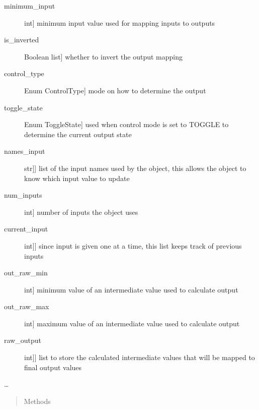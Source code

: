 \documentclass[letterpaper,10pt,english]{sphinxmanual}
\begin{document}
\begin{fulllineitems}
\begin{description}
\item[{minimum\_input}] \leavevmode{[}int{]}
\sphinxAtStartPar
minimum input value used for mapping inputs to outputs

\item[{is\_inverted}] \leavevmode{[}Boolean list{]}
\sphinxAtStartPar
whether to invert the output mapping

\item[{control\_type}] \leavevmode{[}Enum ControlType{]}
\sphinxAtStartPar
mode on how to determine the output

\item[{toggle\_state}] \leavevmode{[}Enum ToggleState{]}
\sphinxAtStartPar
used when control mode is set to TOGGLE to determine the current output state

\item[{names\_input}] \leavevmode{[}{[}str{]}{]}
\sphinxAtStartPar
list of the input names used by the object, this allows the object to know which input value to update

\item[{num\_inputs}] \leavevmode{[}int{]}
\sphinxAtStartPar
number of inputs the object uses

\item[{current\_input}] \leavevmode{[}{[}int{]}{]}
\sphinxAtStartPar
since input is given one at a time, this list keeps track of previous inputs

\item[{out\_raw\_min}] \leavevmode{[}int{]}
\sphinxAtStartPar
minimum value of an intermediate value used to calculate output

\item[{out\_raw\_max}] \leavevmode{[}int{]}
\sphinxAtStartPar
maximum value of an intermediate value used to calculate output

\item[{raw\_output}] \leavevmode{[}{[}int{]}{]}
\sphinxAtStartPar
list to store the calculated intermediate values that will be mapped to final output values

\end{description}

\sphinxAtStartPar
…
\begin{quote}\begin{description}
\item[{Methods}] \leavevmode
\end{description}\end{quote}


\end{fulllineitems}
\end{document}

